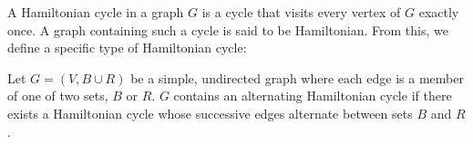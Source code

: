 \documentclass[authoryear]{elsarticle}
\begin{document}
\begin{comment}
We begin by modelling a given instance $\mathcal{M}$ of the COP as a vertex-weighted graph $G$, which has a vertex set $V$ defined using one vertex for each element in $\mathcal{M}$ in non-decreasing order. Each vertex $v_i \in V$ is weighted with the value in $\mathcal{M}$ it represents. To prevent executing the algorithm unnecessarily, a basic preliminary test is performed to determine if the instance is infeasible. Of the $2n$ vertices, suppose the smallest vertices $v_1$ and $v_2$ are placed on the ends of the sequence. Clearly, if the next-smallest vertex $v_3$ and the largest vertex $v_{2n}$ do not meet the vicinal sum constraint, then there cannot exist a feasible ordering of all elements in $\mathcal{M}$. Note that a positive outcome from this test does not necessarily imply that a feasible solution exists for the instance, however a negative outcome confirms the non-existence of a solution.

If $\mathcal{M}$ has not been deemed infeasible an extra pair of vertices $v_{2n+1}, v_{2n+2}$ is added to $G$, each assigned a weight equal to $\tau$. $G$ now comprises two edge sets: $B$, which contains edges between vertices that are \emph{partners}, that is, whose weights make up an unordered pair in $\mathcal{M}$; and $R$, containing edges between vertices that add up to $\geq \tau$ and are not partners. The additional vertices are partners, and can be seen to be universal vertices as they are adjacent to every other vertex via an edge in $R$; thus both have degree $2n+1$. Given the bijective function $p : V \to V$ that associates each vertex $v_i \in V$ with its partner $p(v_i)$, the set of edges between partners can be denoted as $B = \{(v_i, p(v_i)) : v_i \in V\}$. Note that $|B| = n+1$, and so $B$ is a perfect matching in all cases. Figure~\ref{fig:threshold} illustrates the resulting graph $G = (V, B \cup R)$ produced from the example instance $\mathcal{M}$ of the COP provided above. The graph has a noticeable pattern, with the degree of each vertex increasing in accordance with the weight of the vertices. 
\end{comment}


A Hamiltonian cycle in a graph $G$ is a cycle that visits every vertex of $G$ exactly once. A graph containing such a cycle is said to be Hamiltonian. From this, we define a specific type of Hamiltonian cycle:

\begin{definition} %
	\label{defn:althamcycle}
	Let $G = (V, B \cup R)$ be a simple, undirected graph where each edge is a member of one of two sets, $B$ or $R$. $G$ contains an alternating Hamiltonian cycle if there exists a Hamiltonian cycle whose successive edges alternate between sets $B$ and $R$.
\end{definition}
\end{document}
